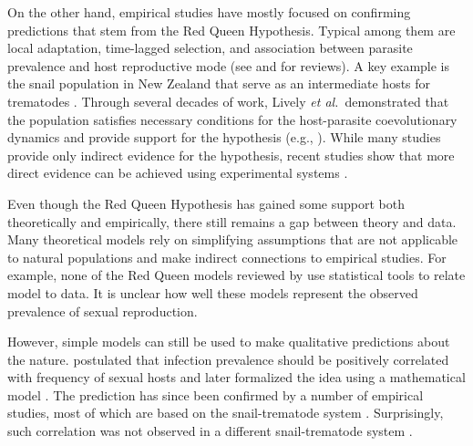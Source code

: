 \documentclass{article}\usepackage[]{graphicx}\usepackage[]{color}
\newcommand{\etal}{\textit{et al.}}
\begin{document}
On the other hand, empirical studies have mostly focused on confirming predictions that stem from the Red Queen Hypothesis.
Typical among them are local adaptation, time-lagged selection, and association between parasite prevalence and host reproductive mode (see \cite{tobler2008expanding} and \cite{vergara2014infection} for reviews).
A key example is the snail population in New Zealand that serve as an intermediate hosts for trematodes \citep{winterbourn1974larval, mcarthur1976suppression}.
Through several decades of work, Lively \etal\ demonstrated that the population satisfies necessary conditions for the host-parasite coevolutionary dynamics and provide support for the hypothesis (e.g., \cite{lively1987evidence, lively1989adaptation, dybdahl1995host, dybdahl1998host, jokela2009maintenance, vergara2014infection, gibson2016within}).
While many studies provide only indirect evidence for the hypothesis, 
recent studies show that more direct evidence can be achieved using experimental systems \citep{auld2016sex, slowinski2016coevolutionary}.

Even though the Red Queen Hypothesis has gained some support both theoretically and empirically, there still remains a gap between theory and data.
Many theoretical models rely on simplifying assumptions that are not applicable to natural populations and make indirect connections to empirical studies.
For example, none of the Red Queen models reviewed by \cite{ashby2015diversity} use statistical tools to relate model to data.
It is unclear how well these models represent the observed prevalence of sexual reproduction.

However, simple models can still be used to make qualitative predictions about the nature.
\cite{lively1992parthenogenesis} postulated that infection prevalence should be positively correlated with frequency of sexual hosts and later formalized the idea using a mathematical model \citep{lively2001trematode}.
The prediction has since been confirmed by a number of empirical studies, most of which are based on the snail-trematode system \citep{lively2002temporal, kumpulainen2004parasites, king2011parasites, vergara2013geographic, mckone2016fine, gibson2016within}.
Surprisingly, such correlation was not observed in a different snail-trematode system \citep{dagan2013clonal}.
\end{document}
